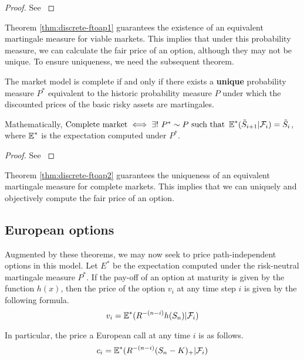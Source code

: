 \begin{proof}
	See \cite[page 6, Theorem 1.2.7]{Lamberton1996}
\end{proof}

Theorem \ref{thm:discrete-ftoap1} guarantees the existence of an equivalent martingale measure for viable markets. This implies that under this probability measure, we can calculate the fair price of an option, although they may not be unique. To ensure uniqueness, we need the subsequent theorem.

\begin{thm}
	\label{thm:discrete-ftoap2}
	The market model is complete if and only if there exists a \textbf{unique} probability measure $ P^* $ equivalent to the historic probability measure $ P $ under which the discounted prices of the basic risky assets are martingales.
	
	Mathematically,
	$ \text{Complete market} \iff \exists! \  P^* \sim P \text{ such that } \operatorname{\mathbb{E}}^*( \tilde{S}_{i+1} | \mathcal{F}_i ) = \tilde{S}_{i} $, where $ \operatorname{\mathbb{E}}^* $ is the expectation computed under $ P^* $.
\end{thm}

\begin{proof}
	See \cite[page 9, Theorem 1.3.4]{Lamberton1996}
\end{proof}

Theorem \ref{thm:discrete-ftoap2} guarantees the uniqueness of an equivalent martingale measure for complete markets. This implies that we can uniquely and objectively compute the fair price of an option.



\subsection{European options}

Augmented by these theorems, we may now seek to price path-independent options in this model. Let $ E^* $ be the expectation computed under the risk-neutral martingale measure $ P^* $. If the pay-off of an option at maturity is given by the function $ h(x) $, then the price of the option $ v_i $ at any time step $ i $ is given by the following formula.
\begin{equation}
	\label{eq:discrete-crr-eu-pr}
	v_i = \operatorname{\mathbb{E}}^*( R^{-(n - i)} h(S_n) | \mathcal{F}_i )
\end{equation}

In particular, the price a European call at any time $ i $ is as follows.
\begin{equation}
	\label{eq:discrete-crr-eu-call-pr}
	c_i = \operatorname{\mathbb{E}}^*( R^{-(n - i)} (S_n - K)_+ | \mathcal{F}_i )
\end{equation}


